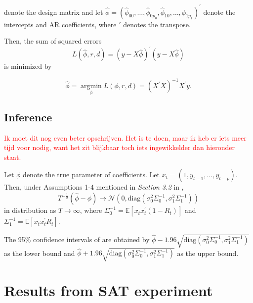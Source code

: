 \documentclass{article}
\newcommand{\E}{\mathbb{E}}
\DeclareMathOperator*{\argmin}{argmin}
\begin{document}
denote the design matrix and let
$\hat{\phi} = (\hat{\phi}_{00}, \dots, \hat{\phi}_{0 p_0}, \hat{\phi}_{10}, \dots, \hat{\phi}_{1 p_1})^\prime$
denote the intercepts and AR coefficients, where $\prime$ denotes the transpose.

Then, the sum of squared errors 
$$L(\hat{\phi}, r, d) = (y - X \hat{\phi})^\prime (y - X \hat{\phi})$$
is minimized by

$$\hat{\phi} = \argmin\limits_{\phi} L(\phi, r, d) = 
(X^\prime X)^{-1} X^\prime y.$$

\subsection{Inference} \label{app:inference}
\textcolor{red}{Ik moet dit nog even beter opschrijven. Het is te doen, maar ik heb er iets meer tijd voor nodig, want het zit blijkbaar toch iets ingewikkelder dan hieronder staat.}

Let $\phi$ denote the true parameter of coefficients. Let $x_t = (1, y_{t-1}, \dots, y_{t-p})$.
Then, under Assumptions 1-4 mentioned in \textit{Section 3.2} in \citet{bar2}, 
$$T^{-\frac{1}{2}} (\hat{\phi} - \phi) \rightarrow \mathcal{N} \left( 0, \mathrm{diag}(\sigma_0^2 \Sigma_0^{-1}, \sigma_1^2 \Sigma_1^{-1}) \right)$$
in distribution as $T \rightarrow \infty$, where
$\Sigma_0^{-1} = \E[x_t x_t^\prime (1-R_t)]$ and 
$\Sigma_1^{-1} = \E[x_t x_t^\prime R_t].$

The 95\% confidence intervals of are obtained by
$\hat{\phi} - 1.96 \sqrt{\mathrm{diag}(\sigma_0^2 \Sigma_0^{-1}, \sigma_1^2 \Sigma_1^{-1})}$ as the lower bound and 
$\hat{\phi} + 1.96 \sqrt{\mathrm{diag}(\sigma_0^2 \Sigma_0^{-1}, \sigma_1^2 \Sigma_1^{-1})}$ as the upper bound.

\section{Results from SAT experiment}
\label{app:results_SAT}
\end{document}
